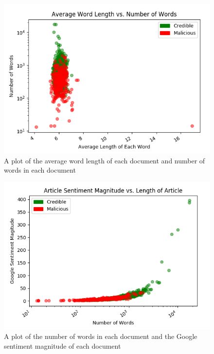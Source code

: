 \begin{figure}[h!]
\centering
\captionsetup{justification=centering,width=0.95\textwidth}
\centerline{\includegraphics[scale=0.65]{wordlenNumWordsLogScale.png}}
\caption[Average Word Length vs Number of Words]{
    A plot of the average word length of each document and number of words in each document
}
\label{fig:wordlenNumWordsLogScale}
\end{figure}


\begin{figure}[h!]
\centering
\captionsetup{justification=centering,width=0.95\textwidth}
\centerline{\includegraphics[scale=0.65]{sentimentMagnitude_vs_ArticleLen.png}}
\caption[Number of Words vs Google Sentiment Magnitude]{
    A plot of the number of words in each document and the Google sentiment magnitude of each document
}
\label{fig:numWordsToSentimentMagnitude}
\end{figure}


